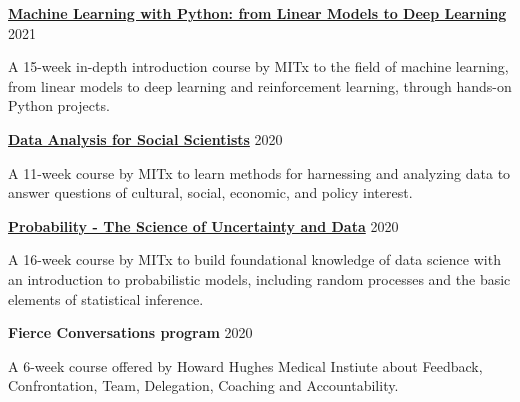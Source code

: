 \documentclass[margin,line]{res}
\begin{document}
\begin{resume}
{\bf \href{https://www.edx.org/course/machine-learning-with-python-from-linear-models-to}{Machine Learning with Python: from Linear Models to Deep Learning}} \hfill {2021}\\
\vspace*{-3.5mm}
\begin{addmargin}[0pt]{.1\linewidth}
\vspace*{-1mm}
A 15-week in-depth introduction course by MITx to the field of machine learning, from linear models to deep learning and reinforcement learning, through hands-on Python projects.
\end{addmargin}

\vspace*{-2mm}


{\bf \href{https://www.edx.org/course/data-analysis-for-social-scientists}{Data Analysis for Social Scientists}} \hfill {2020}\\
\vspace*{-3.5mm}
\begin{addmargin}[0pt]{.1\linewidth}
\vspace*{-1mm}
A 11-week course by MITx to learn methods for harnessing and analyzing data to answer questions of cultural, social, economic, and policy interest.
\end{addmargin}

\vspace*{-2mm}

{\bf \href{https://www.edx.org/course/probability-the-science-of-uncertainty-and-data}{Probability - The Science of Uncertainty and Data}} \hfill {2020}\\
\vspace*{-3.5mm}
\begin{addmargin}[0pt]{.1\linewidth}
\vspace*{-1mm}
A 16-week course by MITx to build foundational knowledge of data science with an introduction to probabilistic models, including random processes and the basic elements of statistical inference.
\end{addmargin}

\vspace*{-2mm}

{\bf Fierce Conversations program} \hfill {2020}\\
\vspace*{-3.5mm}
\begin{addmargin}[0pt]{.1\linewidth}
\vspace*{-1mm}
A 6-week course offered by Howard Hughes Medical Instiute about Feedback, Confrontation, Team, Delegation, Coaching and Accountability.
\end{addmargin}


\end{resume}
\end{document}
